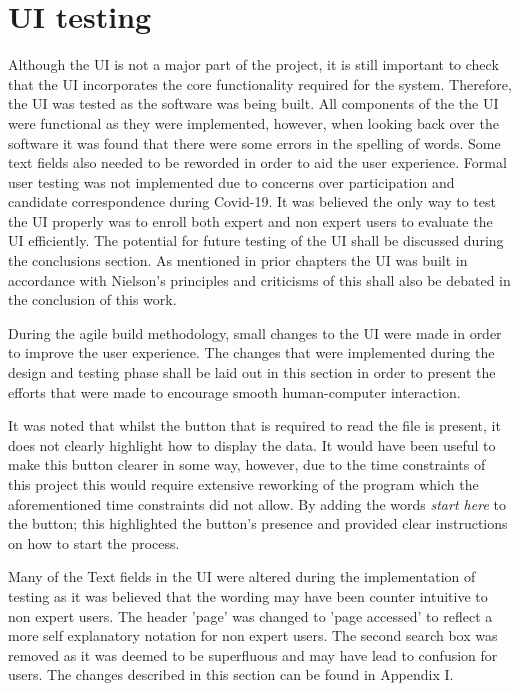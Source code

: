 \section{UI testing}

Although the UI is not a major part of the project, it is still important to check that the UI incorporates the core functionality required for the system. Therefore, the UI was tested as the software was being built. All components of the the UI were functional as they were implemented, however, when looking back over the software it was found that there were some errors in the spelling of words. Some text fields also needed to be reworded in order to aid the user experience. Formal user testing was not implemented due to concerns over participation and candidate correspondence during Covid-19. It was believed the only way to test the UI properly was to enroll both expert and non expert users to evaluate the UI efficiently. The potential for future testing of the UI shall be discussed during the conclusions section. As mentioned in prior chapters the UI was built in accordance with Nielson's principles and criticisms of this shall also be debated in the conclusion of this work. 

During the agile build methodology, small changes to the UI were made in order to improve the user experience. The changes that were implemented during the design and testing phase shall be laid out in this section in order to present the efforts that were made to encourage smooth human-computer interaction.

It was noted that whilst the button that is required to read the file is present, it does not clearly highlight how to display the data. It would have been useful to make this button clearer in some way, however, due to the time constraints of this project this would require extensive reworking of the program which the aforementioned time constraints did not allow. By adding the words \textit{start here} to the button; this highlighted the button's presence and provided clear instructions on how to start the process.

Many of the Text fields in the UI were altered during the implementation of testing as it was believed that the wording may have been counter intuitive to non expert users. The header 'page' was changed to 'page accessed' to reflect a more self explanatory notation for non expert users. The second search box was removed as it was deemed to be superfluous and may have lead to confusion for users. The changes described in this section can be found in Appendix I.